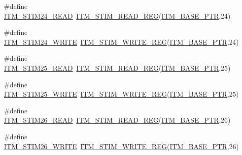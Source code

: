 \begin{DoxyCompactItemize}
\item 
\#define \hyperlink{group___i_t_m___register___accessor___macros_ga114f7258f85d135f2e6e5f6bf2fff8a6}{I\+T\+M\+\_\+\+S\+T\+I\+M24\+\_\+\+R\+E\+AD}~\hyperlink{group___i_t_m___register___accessor___macros_ga5009882336aadcd4f37b45cf3395c450}{I\+T\+M\+\_\+\+S\+T\+I\+M\+\_\+\+R\+E\+A\+D\+\_\+\+R\+EG}(\hyperlink{group___i_t_m___peripheral_gafaddee8fe8b6a898d4e5edc43ee0d703}{I\+T\+M\+\_\+\+B\+A\+S\+E\+\_\+\+P\+TR},24)
\item 
\#define \hyperlink{group___i_t_m___register___accessor___macros_gaba2149ea4a29fd70514c8e637a6cedd9}{I\+T\+M\+\_\+\+S\+T\+I\+M24\+\_\+\+W\+R\+I\+TE}~\hyperlink{group___i_t_m___register___accessor___macros_ga049ca92a4e78e77c19af81e51aa73f1c}{I\+T\+M\+\_\+\+S\+T\+I\+M\+\_\+\+W\+R\+I\+T\+E\+\_\+\+R\+EG}(\hyperlink{group___i_t_m___peripheral_gafaddee8fe8b6a898d4e5edc43ee0d703}{I\+T\+M\+\_\+\+B\+A\+S\+E\+\_\+\+P\+TR},24)
\item 
\#define \hyperlink{group___i_t_m___register___accessor___macros_ga5e80b2d49c4833d6faa2843b39cc71e0}{I\+T\+M\+\_\+\+S\+T\+I\+M25\+\_\+\+R\+E\+AD}~\hyperlink{group___i_t_m___register___accessor___macros_ga5009882336aadcd4f37b45cf3395c450}{I\+T\+M\+\_\+\+S\+T\+I\+M\+\_\+\+R\+E\+A\+D\+\_\+\+R\+EG}(\hyperlink{group___i_t_m___peripheral_gafaddee8fe8b6a898d4e5edc43ee0d703}{I\+T\+M\+\_\+\+B\+A\+S\+E\+\_\+\+P\+TR},25)
\item 
\#define \hyperlink{group___i_t_m___register___accessor___macros_ga63f5197346498fb81ab45a43ebc85819}{I\+T\+M\+\_\+\+S\+T\+I\+M25\+\_\+\+W\+R\+I\+TE}~\hyperlink{group___i_t_m___register___accessor___macros_ga049ca92a4e78e77c19af81e51aa73f1c}{I\+T\+M\+\_\+\+S\+T\+I\+M\+\_\+\+W\+R\+I\+T\+E\+\_\+\+R\+EG}(\hyperlink{group___i_t_m___peripheral_gafaddee8fe8b6a898d4e5edc43ee0d703}{I\+T\+M\+\_\+\+B\+A\+S\+E\+\_\+\+P\+TR},25)
\item 
\#define \hyperlink{group___i_t_m___register___accessor___macros_ga8c35b9a8ec5da55c3822fd3960b46ffd}{I\+T\+M\+\_\+\+S\+T\+I\+M26\+\_\+\+R\+E\+AD}~\hyperlink{group___i_t_m___register___accessor___macros_ga5009882336aadcd4f37b45cf3395c450}{I\+T\+M\+\_\+\+S\+T\+I\+M\+\_\+\+R\+E\+A\+D\+\_\+\+R\+EG}(\hyperlink{group___i_t_m___peripheral_gafaddee8fe8b6a898d4e5edc43ee0d703}{I\+T\+M\+\_\+\+B\+A\+S\+E\+\_\+\+P\+TR},26)
\item 
\#define \hyperlink{group___i_t_m___register___accessor___macros_ga56f074bfff0348baad454e7fba80c007}{I\+T\+M\+\_\+\+S\+T\+I\+M26\+\_\+\+W\+R\+I\+TE}~\hyperlink{group___i_t_m___register___accessor___macros_ga049ca92a4e78e77c19af81e51aa73f1c}{I\+T\+M\+\_\+\+S\+T\+I\+M\+\_\+\+W\+R\+I\+T\+E\+\_\+\+R\+EG}(\hyperlink{group___i_t_m___peripheral_gafaddee8fe8b6a898d4e5edc43ee0d703}{I\+T\+M\+\_\+\+B\+A\+S\+E\+\_\+\+P\+TR},26)

\end{DoxyCompactItemize}
